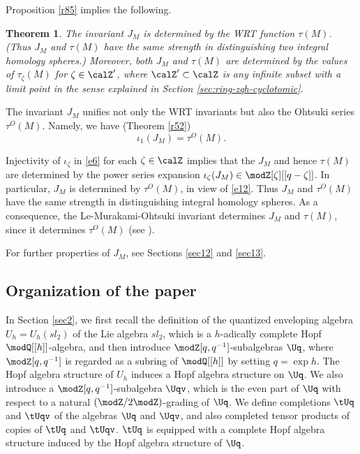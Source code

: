 \documentclass{amsart}
\numberwithin{equation}{section}
\numberwithin{figure}{section}
\theoremstyle{plain}
\newtheorem{theorem}{Theorem}[section]
\theoremstyle{definition}
\theoremstyle{remark}
\begin{document}
Proposition \ref{r85} implies the following.

\begin{theorem}
  \label{r48}
  The invariant $J_M$ is determined by the WRT function $\tau (M)$.
  (Thus $J_M$ and $\tau (M)$ have the same strength in distinguishing two
  integral homology spheres.)  Moreover, both $J_M$ and $\tau (M)$ are
  determined by the values of $\tau _\zeta (M)$ for $\zeta \in \calZ'$, where
  $\calZ'\subset \calZ$ is any infinite subset with a limit point in the
  sense explained in Section \ref{sec:ring-zqh-cyclotomic}.
\end{theorem}

The invariant $J_M$ unifies not only the WRT invariants but also the
Ohtsuki series $\tau ^O(M)$.  Namely, we have (Theorem \ref{r52})
\begin{equation}
  \label{e12}
  \iota _1(J_M)=\tau ^O(M).
\end{equation}

Injectivity of $\iota _\zeta $ in \eqref{e6} for each $\zeta \in \calZ$ implies that
the $J_M$ and hence $\tau (M)$ are determined by the power series
expansion $\iota _\zeta (J_M)\in \modZ [\zeta ][[q-\zeta ]]$.  In particular, $J_M$ is
determined by $\tau ^O(M)$, in view of \ref{e12}.  Thus $J_M$ and
$\tau ^O(M)$ have the same strength in distinguishing integral homology
spheres.  As a consequence, the Le-Murakami-Ohtsuki invariant
\cite{LMO} determines $J_M$ and $\tau (M)$, since it determines $\tau ^O(M)$
(see \cite{Ohtsuki4}).

For further properties of $J_M$, see Sections \ref{sec12} and
\ref{sec13}.

\subsection{Organization of the paper}
\label{sec:organization-paper}

In Section \ref{sec2}, we first recall the definition of the quantized
enveloping algebra $U_h=U_h(sl_2)$ of the Lie algebra $sl_2$, which is
a $h$-adically complete Hopf $\modQ [[h]]$-algebra, and then introduce
$\modZ [q,q^{-1}]$-subalgebras $\Uq$, where $\modZ [q,q^{-1}]$ is regarded as
a subring of $\modQ [[h]]$ by setting $q=\exp h$.  The Hopf algebra
structure of $U_h$ induces a Hopf algebra structure on $\Uq$.  We also
introduce a $\modZ [q,q^{-1}]$-subalgebra $\Uqv$, which is the even part
of $\Uq$ with respect to a natural $(\modZ /2\modZ )$-grading of $\Uq$.
We define completions $\tUq$ and $\tUqv$ of the algebras $\Uq$ and
$\Uqv$, and also completed tensor products of copies of $\tUq$ and
$\tUqv$.  $\tUq$ is equipped with a complete Hopf algebra structure
induced by the Hopf algebra structure of $\Uq$.
\end{document}
